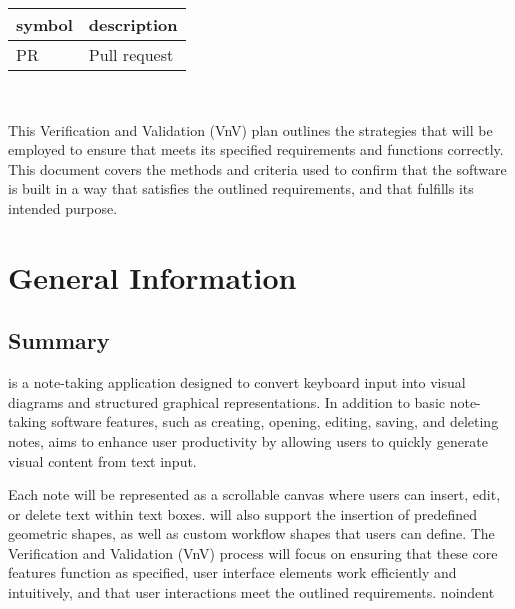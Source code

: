 \documentclass[12pt, titlepage]{article}
\begin{document}
\renewcommand{\arraystretch}{1.2}
\begin{tabular}{l l}
  \toprule
  \textbf{symbol} & \textbf{description}\\
  \midrule
  PR & Pull request\\
  \bottomrule
\end{tabular}\\



\newpage


\noindent This Verification and Validation (VnV) plan outlines the strategies that 
will be employed to ensure that \progname{} meets its specified requirements
and functions correctly. This document covers the methods and criteria used
to confirm that the software is built in a way that satisfies the outlined
requirements, and that fulfills its intended purpose.


\section{General Information}

\subsection{Summary}


\progname{} is a note-taking application designed to convert keyboard input into
visual diagrams and structured graphical representations. In addition to basic
note-taking software features, such as creating, opening, editing, saving, and
deleting notes, \progname{} aims to enhance user productivity by allowing users
to quickly generate visual content from text input. 

\vspace{1em}

\noindent Each note will be represented as a scrollable canvas where users can insert,
edit, or delete text within text boxes. \progname{} will also support the insertion of
predefined geometric shapes, as well as custom workflow shapes that users can
define. The Verification and Validation (VnV) process will focus on ensuring
that these core features function as specified, user interface elements work
efficiently and intuitively, and that user interactions meet the outlined 
requirements.
noindent
\end{document}
